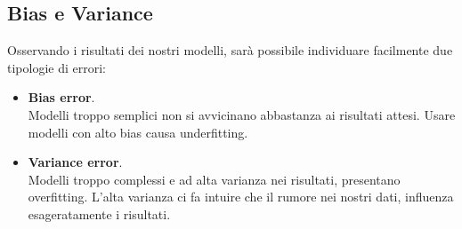 \subsection{Bias e Variance}

Osservando i risultati dei nostri modelli, sarà possibile individuare facilmente due tipologie di errori:
\begin{itemize}
	\item \textbf{Bias error}.\\
	Modelli troppo semplici non si avvicinano abbastanza ai risultati attesi. Usare modelli con alto bias causa underfitting.
	\item \textbf{Variance error}.\\
	Modelli troppo complessi e ad alta varianza nei risultati, presentano overfitting. L'alta varianza ci fa intuire che il rumore nei nostri dati, influenza esageratamente i risultati.
\end{itemize}

